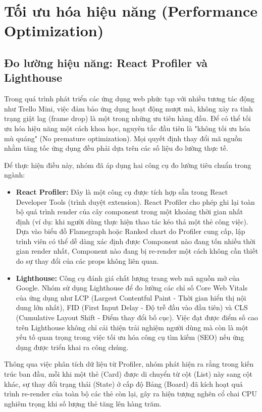 \chapter{Tối ưu hóa hiệu năng (Performance Optimization)}

\section{Đo lường hiệu năng: React Profiler và Lighthouse}
Trong quá trình phát triển các ứng dụng web phức tạp với nhiều tương tác động như Trello Mini, việc đảm bảo ứng dụng hoạt động mượt mà, không xảy ra tình trạng giật lag (frame drop) là một trong những ưu tiên hàng đầu. Để có thể tối ưu hóa hiệu năng một cách khoa học, nguyên tắc đầu tiên là "không tối ưu hóa mù quáng" (No premature optimization). Mọi quyết định thay đổi mã nguồn nhằm tăng tốc ứng dụng đều phải dựa trên các số liệu đo lường thực tế.

Để thực hiện điều này, nhóm đã áp dụng hai công cụ đo lường tiêu chuẩn trong ngành:
\begin{itemize}
    \item \textbf{React Profiler:} Đây là một công cụ được tích hợp sẵn trong React Developer Tools (trình duyệt extension). React Profiler cho phép ghi lại toàn bộ quá trình render của cây component trong một khoảng thời gian nhất định (ví dụ: khi người dùng thực hiện thao tác kéo thả một thẻ công việc). Dựa vào biểu đồ Flamegraph hoặc Ranked chart do Profiler cung cấp, lập trình viên có thể dễ dàng xác định được Component nào đang tốn nhiều thời gian render nhất, Component nào đang bị re-render một cách không cần thiết do sự thay đổi của các props không liên quan.
    \item \textbf{Lighthouse:} Công cụ đánh giá chất lượng trang web mã nguồn mở của Google. Nhóm sử dụng Lighthouse để đo lường các chỉ số Core Web Vitals của ứng dụng như LCP (Largest Contentful Paint - Thời gian hiển thị nội dung lớn nhất), FID (First Input Delay - Độ trễ đầu vào đầu tiên) và CLS (Cumulative Layout Shift - Điểm thay đổi bố cục). Việc đạt được điểm số cao trên Lighthouse không chỉ cải thiện trải nghiệm người dùng mà còn là một yếu tố quan trọng trong việc tối ưu hóa công cụ tìm kiếm (SEO) nếu ứng dụng được triển khai ra công chúng.
\end{itemize}

Thông qua việc phân tích dữ liệu từ Profiler, nhóm phát hiện ra rằng trong kiến trúc ban đầu, mỗi khi một thẻ (Card) được di chuyển từ cột (List) này sang cột khác, sự thay đổi trạng thái (State) ở cấp độ Bảng (Board) đã kích hoạt quá trình re-render của toàn bộ các thẻ còn lại, gây ra hiện tượng nghẽn cổ chai CPU nghiêm trọng khi số lượng thẻ tăng lên hàng trăm.

